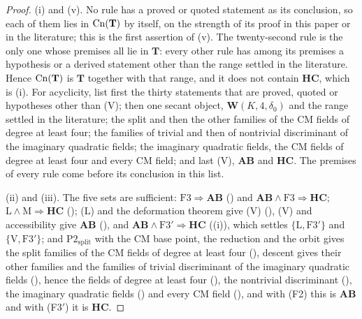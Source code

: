\begin{proof}
(i) and (v). No rule has a proved or quoted statement as its conclusion, so
each of them lies in $\mathrm{Cn}(\mathbf{T})$ by itself, on the strength of its proof
in this paper or in the literature; this is the first assertion of (v). The
twenty-second rule is the only one whose premises all lie in $\mathbf{T}$:
every other rule has among its premises a hypothesis or a derived statement
other than the range settled in the literature. Hence $\mathrm{Cn}(\mathbf{T})$ is
$\mathbf{T}$ together with that range, and it does not contain $\mathbf{HC}$,
which is (i). For acyclicity, list first the thirty statements that are
proved, quoted or hypotheses other than (V); then one secant object,
$\mathbf{W}(K,4,\delta_{0})$ and the range settled in the literature; the
split and then the other families of the CM fields of degree at least four;
the families of trivial and then of nontrivial discriminant of the imaginary
quadratic fields; the imaginary quadratic fields, the CM fields of degree at
least four and every CM field; and last (V), $\mathbf{AB}$ and $\mathbf{HC}$.
The premises of every rule come before its conclusion in this list.

(ii) and (iii). The five sets are sufficient:
$\mathrm{F3}\Rightarrow\mathbf{AB}$ () and
$\mathbf{AB}\wedge\mathrm{F3}\Rightarrow\mathbf{HC}$; $\mathrm{L}\wedge
\mathrm{M}\Rightarrow\mathbf{HC}$ (); (L) and the
deformation theorem give (V) (), (V) and accessibility give
$\mathbf{AB}$ (), and $\mathbf{AB}\wedge\mathrm{F3}'
\Rightarrow\mathbf{HC}$ ((i)), which settles
$\{\mathrm{L},\mathrm{F3}'\}$ and $\{\mathrm{V},\mathrm{F3}'\}$; and
$\mathrm{P2}_{\mathrm{split}}$ with the CM base point, the reduction and the
orbit gives the split families of the CM fields of degree at least four
(), descent gives their other families and the
families of trivial discriminant of the imaginary quadratic fields
(), hence the fields of degree at least four
(), the nontrivial discriminant (),
the imaginary quadratic fields () and every CM field
(), and with (F2) this is $\mathbf{AB}$ and with (F3$'$)
it is $\mathbf{HC}$.


\end{proof}
